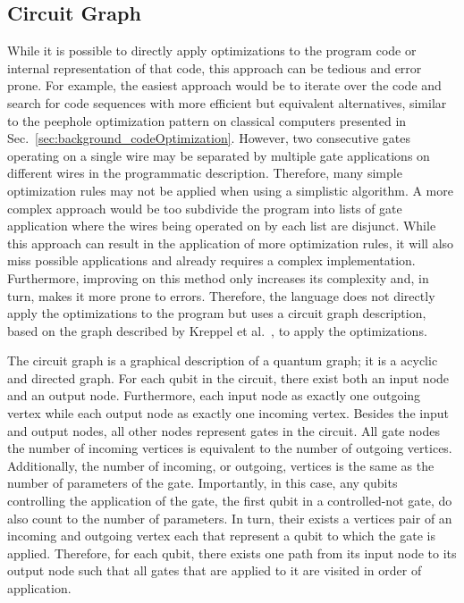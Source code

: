 \subsection{Circuit Graph}
\label{sec:concept_circuitGraph}
While it is possible to directly apply optimizations to the program code or internal representation of that code, this approach can be tedious and error prone. For example, the easiest approach would be to iterate over the code and search for code sequences with more efficient but equivalent alternatives, similar to the peephole optimization pattern on classical computers presented in Sec.~\ref{sec:background_codeOptimization}. However, two consecutive gates operating on a single wire may be separated by multiple gate applications on different wires in the programmatic description. 
Therefore, many simple optimization rules may not be applied when using a simplistic algorithm. A more complex approach would be too subdivide the program into lists of gate application where the wires being operated on by each list are disjunct. While this approach can result in the application of more optimization rules, it will also miss possible applications and already requires a complex implementation. Furthermore, improving on this method only increases its complexity and, in turn, makes it more prone to errors. Therefore, the language does not directly apply the optimizations to the program but uses a circuit graph description, based on the graph described by Kreppel et al.~\cite{KMO*23}, to apply the optimizations.

The circuit graph is a graphical description of a quantum graph; it is a acyclic and directed graph. For each qubit in the circuit, there exist both an input node and an output node. Furthermore, each input node as exactly one outgoing vertex while each output node as exactly one incoming vertex. Besides the input and output nodes, all other nodes represent gates in the circuit. All gate nodes the number of incoming vertices is equivalent to the number of outgoing vertices. Additionally, the number of incoming, or outgoing, vertices is the same as the number of parameters of the gate. Importantly, in this case, any qubits controlling the application of the gate, \eg the first qubit in a controlled-not gate, do also count to the number of parameters. In turn, their exists a vertices pair of an incoming and outgoing vertex each that represent a qubit to which the gate is applied. Therefore, for each qubit, there exists one path from its input node to its output node such that all gates that are applied to it are visited in order of application.

